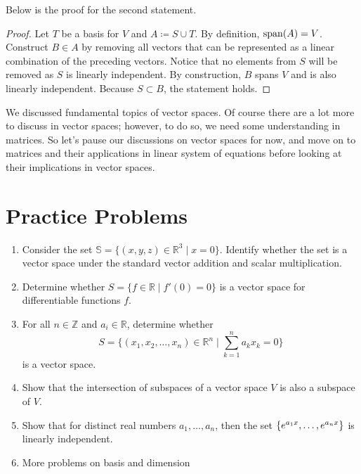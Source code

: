 \documentclass[../main.tex]{subfiles}
\begin{document}
Below is the proof for the second statement.

\begin{proof}
Let $T$ be a basis for $V$ and $A \coloneqq S \cup T$. By definition,
$\operatorname{span}(A) = V$. Construct $B \in A$ by removing all vectors that can
be represented as a linear combination of the preceding vectors.
Notice that no elements from $S$ will be removed as $S$ is linearly
independent. By construction, $B$ spans $V$ and is also linearly
independent. Because $S \subset B$, the statement holds.
\end{proof}

We discussed fundamental topics of vector spaces. Of course there
are a lot more to discuss in vector spaces; however, to do so,
we need some understanding in matrices. So let's pause our discussions
on vector spaces for now, and move on to matrices and their
applications in linear system of equations before looking at their
implications in vector spaces.

\section{Practice Problems}
\begin{enumerate}
\item
Consider the set $\mathbb{S} = \{ (x, y, z) \in \mathbb{R}^3 \mid
x = 0 \}$. Identify whether the set is a vector space under the
standard vector addition and scalar multiplication.

\item
Determine whether $S = \{ f \in \mathbb{R} \mid f'(0) = 0 \}$
is a vector space for differentiable functions $f$.

\item
For all $n \in \mathbb{Z}$ and $a_i \in \mathbb{R}$, determine whether
\[
S = \{ (x_1, x_2, \ldots, x_n) \in \mathbb{R}^n
\mid
\sum_{k = 1}^n a_k x_k = 0 \}
\]
is a vector space.

\item
Show that the intersection of subspaces of a vector space $V$
is also a subspace of $V$.

\item
Show that for distinct real numbers $a_1, \ldots, a_n$, then the set
$\{ e^{a_1 x}, \ldots, \linebreak e^{a_n x} \}$ is linearly independent.

\item More problems on basis and dimension
\end{enumerate}
\end{document}

